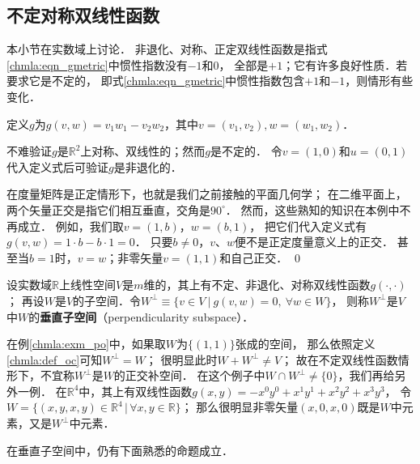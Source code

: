 \subsection{不定对称双线性函数}\label{chmla:sec_indefbif}
本小节在实数域上讨论．
非退化、对称、{\heiti 正定}双线性函数是指式\eqref{chmla:eqn_gmetric}中惯性指数没有$-1$和$0$，
全部是$+1$；它有许多良好性质．若要求它是{\heiti 不定的}，
即式\eqref{chmla:eqn_gmetric}中惯性指数包含$+1$和$-1$，则情形有些变化．

\begin{example}\label{chmla:exm_po}
    定义$g$为$g(v,w)=v_1 w_1 -v_2 w_2$，其中$v=(v_1,v_2), w=(w_1,w_2)$．
\end{example}

不难验证$g$是$\mathbb{R}^2$上对称、双线性的；然而$g$是不定的．
令$v=(1,0)$和$u=(0,1)$代入定义式后可验证$g$是非退化的．

在度量矩阵是正定情形下，也就是我们之前接触的平面几何学；
在二维平面上，两个矢量正交是指它们相互垂直，交角是$90^\circ$．
然而，这些熟知的知识在本例中不再成立．
例如，我们取$v=(1,b)$，$w=(b,1)$，
把它们代入定义式有$g(v,w)=1\cdot b- b\cdot 1 =0$．
只要$b\neq 0$，$v$、$w$便不是正定度量意义上的正交．
甚至当$b=1$时，$v=w$；非零矢量$v=(1,1)$和自己正交．
\qed

\begin{definition}\label{chmla:def_oc}
    设实数域$\mathbb{R}$上线性空间$V$是$m$维的，其上有不定、非退化、对称双线性函数$g(\cdot,\cdot)$；
    再设$W$是$V$的子空间．令$W^\perp \equiv \{v\in V \ |\ g(v,w)=0,\ \forall w\in W \}$，
    则称$W^\perp$是$V$中$W$的{\heiti \bfseries 垂直子空间}（perpendicularity subspace）．
\end{definition}


在例\ref{chmla:exm_po}中，如果取$W$为$\{(1,1)\}$张成的空间，
那么依照定义\ref{chmla:def_oc}可知$W^\perp=W$；
很明显此时$W+W^\perp \neq V$；
故在不定双线性函数情形下，不宜称$W^\perp$是$W$的{\kaishu 正交补空间}．
在这个例子中$W\cap W^\perp \neq \{0\}$，我们再给另外一例．
在$\mathbb{R}^4$中，其上有双线性函数$g(x,y)=-x^0 y^0+x^1 y^1+x^2 y^2+x^3 y^3$，
令$W=\{(x,y,x,y)\in \mathbb{R}^4 \, |\, \forall x,y\in \mathbb{R}\}$；
那么很明显非零矢量$(x,0,x,0)$既是$W$中元素，又是$W^\perp$中元素．


在{\kaishu 垂直子空间}中，仍有下面熟悉的命题成立．


